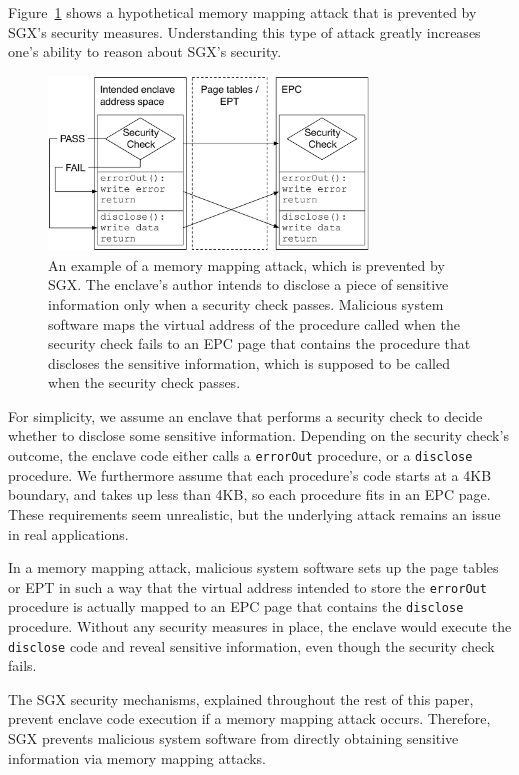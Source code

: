 Figure~\ref{fig:sgx_mapping_attack} shows a hypothetical memory mapping attack
that is prevented by SGX's security measures. Understanding this type of attack
greatly increases one's ability to reason about SGX's security.

\begin{figure}[hbt]
  \centering
  \includegraphics[width=85mm]{figures/sgx_mapping_attack.pdf}
  \caption{
    An example of a memory mapping attack, which is prevented by SGX. The
    enclave's author intends to disclose a piece of sensitive information only
    when a security check passes. Malicious system software maps the virtual
    address of the procedure called when the security check fails to an EPC
    page that contains the procedure that discloses the sensitive information,
    which is supposed to be called when the security check passes.
  }
  \label{fig:sgx_mapping_attack}
\end{figure}

For simplicity, we assume an enclave that performs a security check to decide
whether to disclose some sensitive information. Depending on the security
check's outcome, the enclave code either calls a \texttt{errorOut} procedure,
or a \texttt{disclose} procedure. We furthermore assume that each procedure's
code starts at a 4KB boundary, and takes up less than 4KB, so each procedure
fits in an EPC page. These requirements seem unrealistic, but the underlying
attack remains an issue in real applications.

In a memory mapping attack, malicious system software sets up the page tables
or EPT in such a way that the virtual address intended to store the
\texttt{errorOut} procedure is actually mapped to an EPC page that contains the
\texttt{disclose} procedure. Without any security measures in place, the
enclave would execute the \texttt{disclose} code and reveal sensitive
information, even though the security check fails.

The SGX security mechanisms, explained throughout the rest of this paper,
prevent enclave code execution if a memory mapping attack occurs. Therefore,
SGX prevents malicious system software from directly obtaining sensitive
information via memory mapping attacks.


